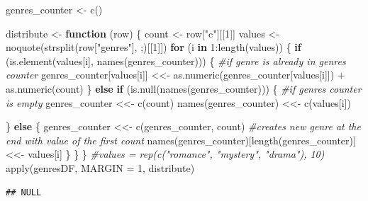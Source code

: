 \documentclass[
]{article}
\newenvironment{Shaded}{\begin{snugshade}}{\end{snugshade}}
\newcommand{\AttributeTok}[1]{\textcolor[rgb]{0.77,0.63,0.00}{#1}}
\newcommand{\CommentTok}[1]{\textcolor[rgb]{0.56,0.35,0.01}{\textit{#1}}}
\newcommand{\ControlFlowTok}[1]{\textcolor[rgb]{0.13,0.29,0.53}{\textbf{#1}}}
\newcommand{\DecValTok}[1]{\textcolor[rgb]{0.00,0.00,0.81}{#1}}
\newcommand{\FunctionTok}[1]{\textcolor[rgb]{0.00,0.00,0.00}{#1}}
\newcommand{\NormalTok}[1]{#1}
\newcommand{\OtherTok}[1]{\textcolor[rgb]{0.56,0.35,0.01}{#1}}
\newcommand{\SpecialCharTok}[1]{\textcolor[rgb]{0.00,0.00,0.00}{#1}}
\newcommand{\StringTok}[1]{\textcolor[rgb]{0.31,0.60,0.02}{#1}}
\begin{document}
\begin{Shaded}
\begin{Highlighting}[]
\NormalTok{genres\_counter }\OtherTok{\textless{}{-}} \FunctionTok{c}\NormalTok{()}

\NormalTok{distribute }\OtherTok{\textless{}{-}} \ControlFlowTok{function}\NormalTok{ (row) \{}
\NormalTok{  count }\OtherTok{\textless{}{-}}\NormalTok{ row[}\StringTok{"c"}\NormalTok{][[}\DecValTok{1}\NormalTok{]]}
\NormalTok{  values }\OtherTok{\textless{}{-}} \FunctionTok{noquote}\NormalTok{(}\FunctionTok{strsplit}\NormalTok{(row[}\StringTok{"genres"}\NormalTok{], }\StringTok{\textquotesingle{};\textquotesingle{}}\NormalTok{)[[}\DecValTok{1}\NormalTok{]])}
  \ControlFlowTok{for}\NormalTok{ (i }\ControlFlowTok{in} \DecValTok{1}\SpecialCharTok{:}\FunctionTok{length}\NormalTok{(values)) \{}
    \ControlFlowTok{if}\NormalTok{ (}\FunctionTok{is.element}\NormalTok{(values[i], }\FunctionTok{names}\NormalTok{(genres\_counter))) \{}
      \CommentTok{\#if genre is already in genres counter}
\NormalTok{      genres\_counter[values[i]] }\OtherTok{\textless{}\textless{}{-}}
        \FunctionTok{as.numeric}\NormalTok{(genres\_counter[values[i]]) }\SpecialCharTok{+} \FunctionTok{as.numeric}\NormalTok{(count)}
\NormalTok{    \} }\ControlFlowTok{else} \ControlFlowTok{if}\NormalTok{ (}\FunctionTok{is.null}\NormalTok{(}\FunctionTok{names}\NormalTok{(genres\_counter))) \{}
      \CommentTok{\#if genres counter is empty}
\NormalTok{      genres\_counter }\OtherTok{\textless{}\textless{}{-}} \FunctionTok{c}\NormalTok{(count)}
      \FunctionTok{names}\NormalTok{(genres\_counter) }\OtherTok{\textless{}\textless{}{-}} \FunctionTok{c}\NormalTok{(values[i])}
      
\NormalTok{    \}}
    \ControlFlowTok{else}\NormalTok{ \{}
\NormalTok{      genres\_counter }\OtherTok{\textless{}\textless{}{-}}
        \FunctionTok{c}\NormalTok{(genres\_counter, count) }\CommentTok{\#creates new genre at the end with value of the first count}
      \FunctionTok{names}\NormalTok{(genres\_counter)[}\FunctionTok{length}\NormalTok{(genres\_counter)] }\OtherTok{\textless{}\textless{}{-}}\NormalTok{ values[i]}
\NormalTok{    \}}
\NormalTok{  \}}
\NormalTok{\}}
\CommentTok{\#values = rep(c("romance", "mystery", "drama"), 10)}
\FunctionTok{apply}\NormalTok{(genresDF, }\AttributeTok{MARGIN =} \DecValTok{1}\NormalTok{, distribute)}
\end{Highlighting}
\end{Shaded}

\begin{verbatim}
## NULL
\end{verbatim}
\end{document}
